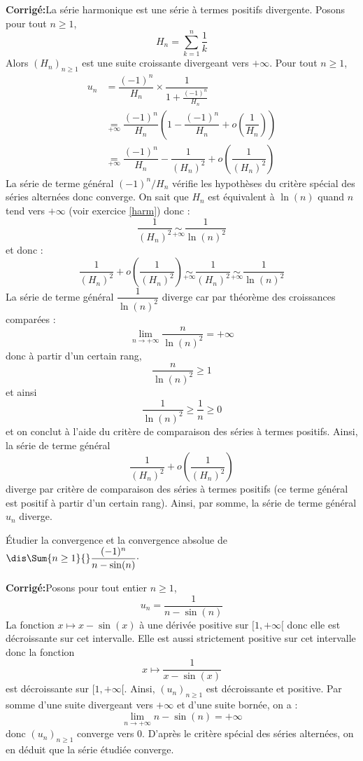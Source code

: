 \documentclass[a4paper,twoside,french,10pt]{VcCours}
\newcommand{\corr}{\textbf{Corrigé:}}
\begin{document}
\corr La série harmonique est une série à termes positifs divergente. Posons pour  tout $n \geq 1$,
$$ H_n = \sum_{k=1}^n \dfrac{1}{k}$$
Alors $(H_n)_{n \geq 1}$ est une suite croissante divergeant vers $+ \infty$. Pour tout $n \geq 1$,
\begin{align*}
u_n & = \dfrac{(-1)^n}{H_n} \times \dfrac{1}{1+ \frac{(-1)^n}{H_n}} \\
& \underset{+\infty}{=}  \dfrac{(-1)^n}{H_n} \left( 1 - \dfrac{(-1)^n}{H_n} + o \left( \dfrac{1}{H_n} \right) \right) \\
& \underset{+\infty}{=}  \dfrac{(-1)^n}{H_n}  -\dfrac{1}{(H_n)^2} + o \left( \dfrac{1}{(H_n)^2} \right) 
\end{align*}
La série de terme général $(-1)^n/H_n$ vérifie les hypothèses du critère spécial des séries alternées donc converge. On sait que $H_n$ est équivalent à $\ln(n)$ quand $n$ tend vers $+ \infty$ (voir exercice \ref{harm}) donc :
$$ \dfrac{1}{(H_n)^2} \underset{+ \infty}{\sim} \dfrac{1}{\ln(n)^2}$$
et donc :
$$ \dfrac{1}{(H_n)^2} + o \left( \dfrac{1}{(H_n)^2} \right)  \underset{+ \infty}{\sim}  \dfrac{1}{(H_n)^2} \underset{+ \infty}{\sim} \dfrac{1}{\ln(n)^2}$$
La série de terme général $\dfrac{1}{\ln(n)^2}$ diverge car par théorème des croissances comparées :
$$ \lim_{n \rightarrow + \infty} \dfrac{n}{\ln(n)^2} = + \infty$$
donc à partir d'un certain rang,
$$ \dfrac{n}{\ln(n)^2} \geq 1$$
et ainsi 
$$ \dfrac{1}{\ln(n)^2} \geq \dfrac{1}{n} \geq 0$$
et on conclut à l'aide du critère de comparaison des séries à termes positifs. Ainsi, la série de terme général 
$$\dfrac{1}{(H_n)^2} + o \left( \dfrac{1}{(H_n)^2} \right)$$
diverge par critère de comparaison des séries à termes positifs (ce terme général est positif à partir d'un certain rang). Ainsi, par somme, la série de terme général $u_n$ diverge.

\medskip

\begin{Exercice}{} Étudier la convergence et la convergence absolue de $\dis \Sum{n \geq 1}{} \dfrac{(-1)^n}{n-\sin(n)}\cdot$
\end{Exercice}

\corr Posons pour tout entier $n \geq 1$,
$$ u_n = \dfrac{1}{n-\sin(n)}$$
La fonction $x \mapsto x- \sin(x)$ à une dérivée positive sur $[1, + \infty[$ donc elle est décroissante sur cet intervalle. Elle est aussi strictement positive sur cet intervalle donc la fonction 
$$ x \mapsto \dfrac{1}{x-\sin(x)}$$
est décroissante sur $[1, + \infty[$. Ainsi, $(u_n)_{n \geq 1}$ est décroissante et positive. Par somme d'une suite divergeant vers $+ \infty$ et d'une suite bornée, on a :
$$ \lim_{n \rightarrow + \infty} n - \sin(n) = + \infty$$
donc $(u_n)_{n \geq 1}$ converge vers $0$. D'après le critère spécial des séries alternées, on en déduit que la série étudiée converge.
\end{document}

